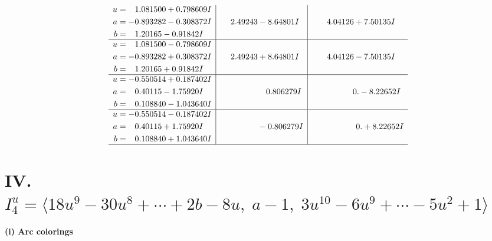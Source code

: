 \documentclass[1p]{elsarticle_modified}
\theoremstyle{definition}
\begin{document}
$$\begin{array}{c|c|c}
\begin{aligned}
u &= \phantom{-}1.081500 + 0.798609 I \\
a &= -0.893282 - 0.308372 I \\
b &= \phantom{-}1.20165 - 0.91842 I\end{aligned}
 & \phantom{-}2.49243 - 8.64801 I & \phantom{-}4.04126 + 7.50135 I \\ \hline\begin{aligned}
u &= \phantom{-}1.081500 - 0.798609 I \\
a &= -0.893282 + 0.308372 I \\
b &= \phantom{-}1.20165 + 0.91842 I\end{aligned}
 & \phantom{-}2.49243 + 8.64801 I & \phantom{-}4.04126 - 7.50135 I \\ \hline\begin{aligned}
u &= -0.550514 + 0.187402 I \\
a &= \phantom{-}0.40115 - 1.75920 I \\
b &= \phantom{-}0.108840 - 1.043640 I\end{aligned}
 & \phantom{-0.000000 -}0.806279 I & \phantom{-0.000000 } 0. - 8.22652 I \\ \hline\begin{aligned}
u &= -0.550514 - 0.187402 I \\
a &= \phantom{-}0.40115 + 1.75920 I \\
b &= \phantom{-}0.108840 + 1.043640 I\end{aligned}
 & \phantom{-0.000000 } -0.806279 I & \phantom{-0.000000 -}0. + 8.22652 I\\
 \hline 
 \end{array}$$\newpage\newpage\renewcommand{\arraystretch}{1}
\centering \section*{IV. $I^u_{4}= \langle 18 u^9-30 u^8+\cdots+2 b-8 u,\;a-1,\;3 u^{10}-6 u^9+\cdots-5 u^2+1 \rangle$}
\flushleft \textbf{(i) Arc colorings}\\
\end{document}
